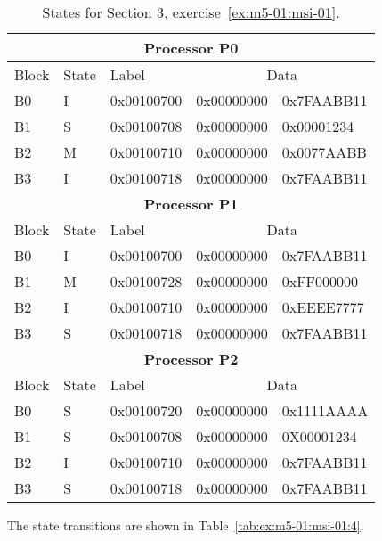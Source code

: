 \begin{table}[htbp]

\begin{tabular}{|l|l|l|l|l|}

\hline
\multicolumn{5}{|c|}{\textbf{Processor P0}}\\
\hline
Block & State & Label & \multicolumn{2}{c|}{Data}\\
\hline
\hline

B0 & I & 0x00100700 & 0x00000000 & 0x7FAABB11\\
\hline
B1 & S & 0x00100708 & 0x00000000 & 0x00001234\\
\hline
B2 & M & 0x00100710 & 0x00000000 & 0x0077AABB\\
\hline
B3 & I & 0x00100718 & 0x00000000 & 0x7FAABB11\\
\hline

\hline
\multicolumn{5}{|c|}{\textbf{Processor P1}}\\
\hline
Block & State & Label & \multicolumn{2}{c|}{Data}\\
\hline
\hline

B0 & I & 0x00100700 & 0x00000000 & 0x7FAABB11\\
\hline
B1 & M & 0x00100728 & 0x00000000 & 0xFF000000\\
\hline
B2 & I & 0x00100710 & 0x00000000 & 0xEEEE7777\\
\hline
B3 & S & 0x00100718 & 0x00000000 & 0x7FAABB11\\
\hline


\hline
\multicolumn{5}{|c|}{\textbf{Processor P2}}\\
\hline
Block & State & Label & \multicolumn{2}{c|}{Data}\\
\hline
\hline

B0 & S & 0x00100720 & 0x00000000 & 0x1111AAAA\\
\hline
B1 & S & 0x00100708 & 0x00000000 & 0X00001234\\
\hline
B2 & I & 0x00100710 & 0x00000000 & 0x7FAABB11\\
\hline
B3 & S & 0x00100718 & {\color{red}0x00000000} & {\color{red}0x7FAABB11}\\
\hline

\end{tabular}

\caption{States for Section 3, exercise~\ref{ex:m5-01:msi-01}.}
\label{tab:ex:m5-01:msi-01:3}

\end{table}

The state transitions are shown in Table~\ref{tab:ex:m5-01:msi-01:4}.

